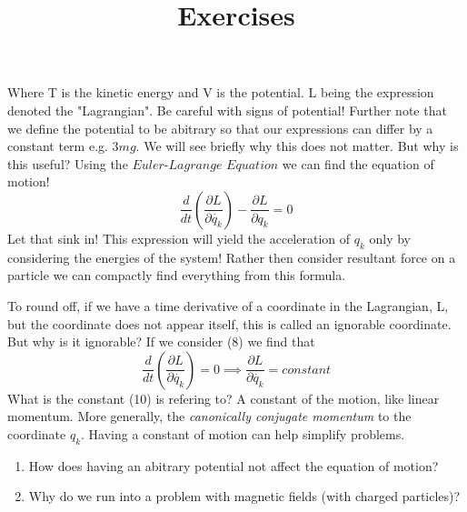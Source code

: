 Where T is the kinetic energy and V is the potential. L being the expression denoted the "Lagrangian". Be careful with signs of potential! Further note that we define the potential to be abitrary so that our expressions can differ by a constant term e.g. $3mg$. We will see briefly why this does not matter. But why is this useful? Using the $\textit{Euler-Lagrange Equation}$ we can find the equation of motion! 
\begin{equation}
\frac{d}{dt} (\frac{\partial L}{\partial \dot{q_{k}}}) - \frac{\partial L}{\partial q_{k}} = 0
\end{equation}
Let that sink in! This expression will yield the acceleration of $q_{k}$ only by considering the energies of the system! Rather then consider resultant force on a particle we can compactly find everything from this formula. \par 
To round off, if we have a time derivative of a coordinate in the Lagrangian, L, but the coordinate does not appear itself, this is called an ignorable coordinate. But why is it ignorable? If we consider (8) we find that 
\begin{equation}
\frac{d}{dt} (\frac{\partial L}{\partial \dot{q_{k}}}) = 0 \implies \frac{\partial L}{\partial \dot{q_{k}}} = constant
\end{equation}
What is the constant (10) is refering to? A constant of the motion, like linear momentum. More generally, the \textit{canonically conjugate momentum} to the coordinate $q_{k}$. Having a constant of motion can help simplify problems.
\par \vfill
\title{\large{Exercises}}
\begin{enumerate}
	\item How does having an abitrary potential not affect the equation of motion? 
	\item Why do we run into a problem with magnetic fields (with charged particles)? 
\end{enumerate}

